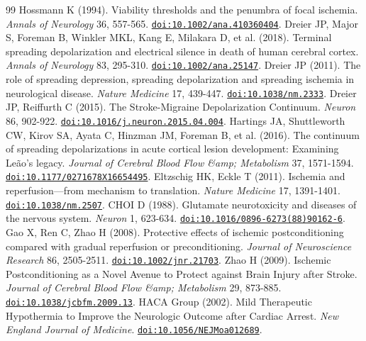 \documentclass[11pt]{article}
\begin{document}
\begin{thebibliography}{99}
 Hossmann K (1994). Viability thresholds and the penumbra of focal ischemia. \emph{Annals of Neurology} 36, 557-565. \href{https://doi.org/10.1002/ana.410360404}{\nolinkurl{doi:10.1002/ana.410360404}}.
 Dreier JP, Major S, Foreman B, Winkler MKL, Kang E, Milakara D, et al. (2018). Terminal spreading depolarization and electrical silence in death of human cerebral cortex. \emph{Annals of Neurology} 83, 295-310. \href{https://doi.org/10.1002/ana.25147}{\nolinkurl{doi:10.1002/ana.25147}}.
 Dreier JP (2011). The role of spreading depression, spreading depolarization and spreading ischemia in neurological disease. \emph{Nature Medicine} 17, 439-447. \href{https://doi.org/10.1038/nm.2333}{\nolinkurl{doi:10.1038/nm.2333}}.
 Dreier JP, Reiffurth C (2015). The Stroke-Migraine Depolarization Continuum. \emph{Neuron} 86, 902-922. \href{https://doi.org/10.1016/j.neuron.2015.04.004}{\nolinkurl{doi:10.1016/j.neuron.2015.04.004}}.
 Hartings JA, Shuttleworth CW, Kirov SA, Ayata C, Hinzman JM, Foreman B, et al. (2016). The continuum of spreading depolarizations in acute cortical lesion development: Examining Leão’s legacy. \emph{Journal of Cerebral Blood Flow \&amp; Metabolism} 37, 1571-1594. \href{https://doi.org/10.1177/0271678X16654495}{\nolinkurl{doi:10.1177/0271678X16654495}}.
 Eltzschig HK, Eckle T (2011). Ischemia and reperfusion—from mechanism to translation. \emph{Nature Medicine} 17, 1391-1401. \href{https://doi.org/10.1038/nm.2507}{\nolinkurl{doi:10.1038/nm.2507}}.
 CHOI D (1988). Glutamate neurotoxicity and diseases of the nervous system. \emph{Neuron} 1, 623-634. \href{https://doi.org/10.1016/0896-6273(88)90162-6}{\nolinkurl{doi:10.1016/0896-6273(88)90162-6}}.
 Gao X, Ren C, Zhao H (2008). Protective effects of ischemic postconditioning compared with gradual reperfusion or preconditioning. \emph{Journal of Neuroscience Research} 86, 2505-2511. \href{https://doi.org/10.1002/jnr.21703}{\nolinkurl{doi:10.1002/jnr.21703}}.
 Zhao H (2009). Ischemic Postconditioning as a Novel Avenue to Protect against Brain Injury after Stroke. \emph{Journal of Cerebral Blood Flow \&amp; Metabolism} 29, 873-885. \href{https://doi.org/10.1038/jcbfm.2009.13}{\nolinkurl{doi:10.1038/jcbfm.2009.13}}.
 HACA Group (2002). Mild Therapeutic Hypothermia to Improve the Neurologic Outcome after Cardiac Arrest. \emph{New England Journal of Medicine}. \href{https://doi.org/10.1056/NEJMoa012689}{\nolinkurl{doi:10.1056/NEJMoa012689}}.

\end{thebibliography}
\end{document}
